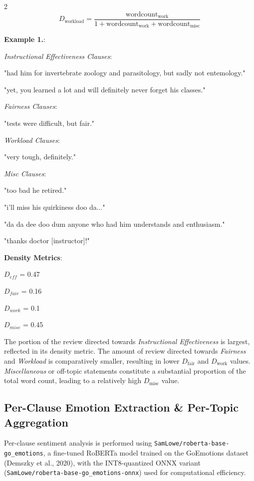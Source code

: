 \documentclass{article}
\begin{document}
\begin{multicols*}{2}
\begin{equation}
D_{\text{workload}} =
\frac{\text{wordcount}_{\text{work}}}
{1 + \text{wordcount}_{\text{work}} + \text{wordcount}_{\text{misc}}}
\end{equation}\newline

\textbf{Example 1.}:\newline

\textit{Instructional Effectiveness Clauses}:

"had him for invertebrate zoology and parasitology, but sadly not entemology."

"yet, you learned a lot and will definitely never forget his classes."\newline

\textit{Fairness Clauses}:\newline

"tests were difficult, but fair."\newline

\textit{Workload Clauses}:

"very tough, definitely."\newline

\textit{Misc Clauses}:

"too bad he retired."

"i'll miss his quirkiness doo da..."

"da da dee doo dum anyone who had him understands and enthusiasm."

"thanks doctor [instructor]!"\newline

\textbf{Density Metrics}:

$D_{eff}$ = 0.47

$D_{fair}$ = 0.16

$D_{work}$ = 0.1

$D_{misc}$ = 0.45\newline

The portion of the review directed towards \textit{Instructional Effectiveness} is largest, reflected in its density metric. The amount of review directed towards \textit{Fairness} and \textit{Workload} is comparatively smaller, resulting in lower $D_\text{fair}$ and $D_\text{work}$ values. \textit{Miscellaneous} or off-topic statements constitute a substantial proportion of the total word count, leading to a relatively high $D_\text{misc}$ value.

\subsection{Per-Clause Emotion Extraction \& Per-Topic Aggregation}
Per-clause sentiment analysis is performed using \texttt{SamLowe/roberta-base-go\_emotions}, a fine-tuned RoBERTa model trained on the GoEmotions dataset (Demszky et al., 2020), with the INT8-quantized ONNX variant (\texttt{SamLowe/roberta-base-go\_emotions-onnx}) used for computational efficiency.


\end{multicols*}
\end{document}
